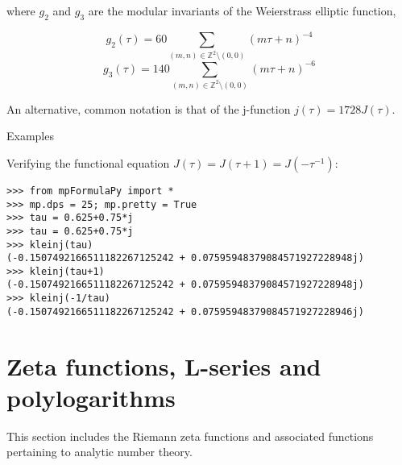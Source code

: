 where $g_2$ and $g_3$ are the modular invariants of the Weierstrass elliptic function,

\begin{equation}
g_2(\tau) = 60 \sum_{(m,n)\in \mathbb{Z}^2\setminus(0,0)} (m \tau + n)^{-4}
\end{equation}
\begin{equation}
g_3(\tau) = 140 \sum_{(m,n)\in \mathbb{Z}^2\setminus(0,0)} (m \tau + n)^{-6}
\end{equation}

An alternative, common notation is that of the j-function $j(\tau)=1728J(\tau)$.

Examples

Verifying the functional equation $J(\tau)=J(\tau+1)=J(-\tau^{-1})$:

\begin{lstlisting}
>>> from mpFormulaPy import *
>>> mp.dps = 25; mp.pretty = True
>>> tau = 0.625+0.75*j
>>> tau = 0.625+0.75*j
>>> kleinj(tau)
(-0.1507492166511182267125242 + 0.07595948379084571927228948j)
>>> kleinj(tau+1)
(-0.1507492166511182267125242 + 0.07595948379084571927228948j)
>>> kleinj(-1/tau)
(-0.1507492166511182267125242 + 0.07595948379084571927228946j)
\end{lstlisting}





\newpage
\chapter{Zeta functions, L-series and polylogarithms}
This section includes the Riemann zeta functions and associated functions pertaining to analytic number theory.

